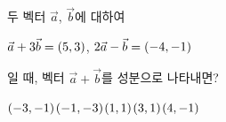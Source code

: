 두 벡터 $\vec{a}$, $\vec{b}$에 대하여 \par\smallskip\noindent\hspace*{1.5em}$\vec{a}+3\vec{b}=(5{,}\mkern3mu\mathopen{}3)$, $2\vec{a}-\vec{b}=(-4{,}\mkern3mu\mathopen{}-1)$\par\smallskip\noindent 일 때, 벡터 $\vec{a}+\vec{b}$를 성분으로 나타내면?
\begin{choices32}{$(-3{,}\mkern3mu\mathopen{}-1)$}{$(-1{,}\mkern3mu\mathopen{}-3)$}{$(1{,}\mkern3mu\mathopen{}1)$}{$(3{,}\mkern3mu\mathopen{}1)$}{$(4{,}\mkern3mu\mathopen{}-1)$}\end{choices32}
